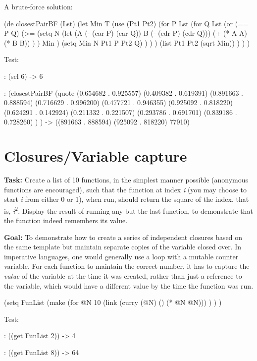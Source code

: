 \begin{wideverbatim}

A brute-force solution:

(de closestPairBF (Lst)
   (let Min T
      (use (Pt1 Pt2)
         (for P Lst
            (for Q Lst
               (or
                  (== P Q)
                  (>=
                     (setq N
                        (let (A (- (car P) (car Q))  B (- (cdr P) (cdr Q)))
                           (+ (* A A) (* B B)) ) )
                     Min )
                  (setq Min N  Pt1 P  Pt2 Q) ) ) )
         (list Pt1 Pt2 (sqrt Min)) ) ) )

Test:

: (scl 6)
-> 6

: (closestPairBF
   (quote
      (0.654682 . 0.925557)
      (0.409382 . 0.619391)
      (0.891663 . 0.888594)
      (0.716629 . 0.996200)
      (0.477721 . 0.946355)
      (0.925092 . 0.818220)
      (0.624291 . 0.142924)
      (0.211332 . 0.221507)
      (0.293786 . 0.691701)
      (0.839186 . 0.728260) ) )
-> ((891663 . 888594) (925092 . 818220) 77910)

\end{wideverbatim}

\pagebreak{}
\section*{Closures/Variable capture}

\textbf{Task:} Create a list of 10 functions, in the simplest manner
possible (anonymous functions are encouraged), such that the function at
index \emph{i} (you may choose to start \emph{i} from either 0 or 1),
when run, should return the square of the index, that is,
\emph{i}\textsuperscript{2}. Display the result of running any but the
last function, to demonstrate that the function indeed remembers its
value.

\textbf{Goal:} To demonstrate how to create a series of independent
closures based on the same template but maintain separate copies of the
variable closed over. In imperative languages, one would generally use a
loop with a mutable counter variable. For each function to maintain the
correct number, it has to capture the \emph{value} of the variable at
the time it was created, rather than just a reference to the variable,
which would have a different value by the time the function was run.


\begin{wideverbatim}

(setq FunList
   (make
      (for @N 10
         (link (curry (@N) () (* @N @N))) ) ) )

Test:

: ((get FunList 2))
-> 4

: ((get FunList 8))
-> 64

\end{wideverbatim}

